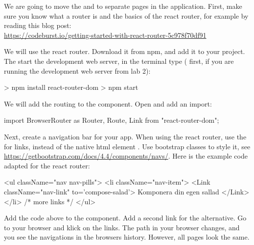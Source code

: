 \documentclass[fleqn, article, a4paper]{memoir}
\begin{document}
\begin{Assignments}

\item We are going to move the  and  to separate pages in the application. First, make sure you know what a router is and the basics of the react router, for example by reading this blog post: 
\\ \url{https://codeburst.io/getting-started-with-react-router-5c978f70df91}

\item We will use the react router. Download it from npm, and add it to your project. The start the development web server, in the terminal type ( first, if you are running the development web server from lab 2):
\begin{Code}
> npm install react-router-dom
> npm start
\end{Code}

\item We will add the routing to the  component. Open  and add an import:
\begin{Code}
import { BrowserRouter as Router, Route, Link } from "react-router-dom";
\end{Code}

\item Next, create a navigation bar for your app. When using the react router, use the  for links, instead of the native html element . Use bootstrap classes to style it, see \url{https://getbootstrap.com/docs/4.4/components/navs/}. Here is the example code adapted for the react router:
\begin{Code}
<ul className="nav nav-pills">
  <li className="nav-item">
    <Link className="nav-link" to='compose-salad'>
      Komponera din egen sallad
    </Link>
  </li>
  {/* more links */}
</ul>
\end{Code}
Add the code above to the  component. Add a second link for the  alternative. Go to your browser and klick on the links. The path in your browser changes, and you see the navigations in the browsers history. However, all pages look the same.


\end{Assignments}
\end{document}
